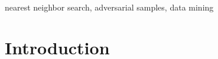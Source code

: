 \documentclass{ieeeaccess}
\begin{document}
\begin{keywords}
nearest neighbor search,  adversarial samples,  data mining
\end{keywords}

\titlepgskip=-15pt

\maketitle
\pagestyle{empty}  %
\thispagestyle{empty} %

\section{Introduction}

\end{document}
